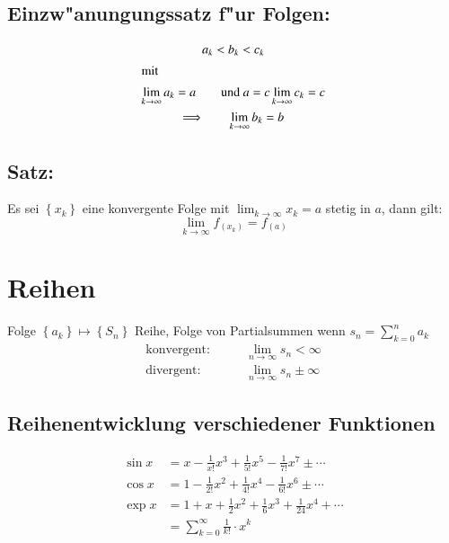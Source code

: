 \subsection{Einzw"anungungssatz f"ur Folgen:}
\begin{gather}
  a_k < b_k < c_k \\
\intertext{mit}
  \lim_{k\rightarrow\infty}a_k=a\qquad\text{und }a=c\lim_{k\to\infty}c_k = c \\
  \Longrightarrow\qquad\lim_{k\to\infty}b_k = b
\end{gather}

\subsection{Satz:}
Es sei $\left\{x_k\right\}$ eine konvergente Folge mit
$\lim_{k\rightarrow\infty}x_k=a$ stetig in $a$, dann gilt:
\begin{equation}
  \lim_{k\to\infty}f_{(x_k)} = f_{(a)}
\end{equation}


\section{Reihen}
Folge $\left\{a_k\right\}\longmapsto\left\{S_n\right\}$ Reihe, Folge
von Partialsummen wenn $s_n = \sum_{k=0}^n a_k$
\begin{align}
  \text{konvergent:}\qquad & \lim_{n\rightarrow\infty}s_n < \infty \\
  \text{divergent:}\qquad  & \lim_{n\rightarrow\infty}s_n \pm\infty
\end{align}

\subsection{Reihenentwicklung verschiedener Funktionen}
\begin{align}
  \sin{x} &= x - \frac{1}{x!}x^3 + \frac{1}{5!}x^5 - \frac{1}{7!}x^7 \pm \cdots \\
  \cos{x} &= 1 - \frac{1}{2!}x^2 + \frac{1}{4!}x^4 - \frac{1}{6!}x^6 \pm \cdots \\
  \exp{x} &= 1 + x + \frac{1}{2}x^2 + \frac{1}{6}x^3 + \frac{1}{24}x^4 + \cdots \\
          &= \sum_{k=0}^\infty \frac{1}{k!}\cdot x^k
\end{align}

